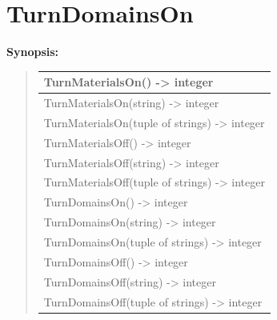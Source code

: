 \documentclass[letterpaper,10pt,english]{sphinxmanual}
\begin{document}
\section{TurnDomainsOn}
\label{functions:turndomainson}
\begin{DUlineblock}{0em}
\item[] \textbf{Synopsis:}
\end{DUlineblock}
\begin{quote}

\begin{tabulary}{\linewidth}{|L|}
\hline

TurnMaterialsOn() -\textgreater{} integer
\\
\hline
TurnMaterialsOn(string) -\textgreater{} integer
\\
\hline
TurnMaterialsOn(tuple of strings) -\textgreater{} integer
\\
\hline
TurnMaterialsOff() -\textgreater{} integer
\\
\hline
TurnMaterialsOff(string) -\textgreater{} integer
\\
\hline
TurnMaterialsOff(tuple of strings) -\textgreater{} integer
\\
\hline
TurnDomainsOn() -\textgreater{} integer
\\
\hline
TurnDomainsOn(string) -\textgreater{} integer
\\
\hline
TurnDomainsOn(tuple of strings) -\textgreater{} integer
\\
\hline
TurnDomainsOff() -\textgreater{} integer
\\
\hline
TurnDomainsOff(string) -\textgreater{} integer
\\
\hline
TurnDomainsOff(tuple of strings) -\textgreater{} integer
\\
\hline\end{tabulary}

\end{quote}
\end{document}
